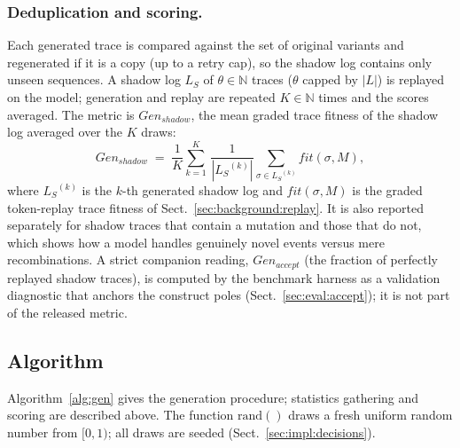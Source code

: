 \documentclass[runningheads]{llncs}
\newcommand{\genshadow}{\ensuremath{\mathit{Gen}_{\mathit{shadow}}}}
\newcommand{\genaccept}{\ensuremath{\mathit{Gen}_{\mathit{accept}}}}
\newcommand{\shlog}{\ensuremath{L_S}}
\begin{document}
\subsubsection{Deduplication and scoring.}
Each generated trace is compared against the set of original variants and regenerated if it is a copy (up to a retry cap), so the shadow log contains only unseen sequences. A shadow log $\shlog$ of $\theta\in\mathbb{N}$ traces ($\theta$ capped by $|L|$) is replayed on the model; generation and replay are repeated $K\in\mathbb{N}$ times and the scores averaged. The metric is \genshadow{}, the mean graded trace fitness of the shadow log averaged over the $K$ draws:
\begin{equation}
\genshadow \;=\; \frac{1}{K}\sum_{k=1}^{K}\,\frac{1}{|\shlog^{(k)}|}\sum_{\sigma\in\shlog^{(k)}}\mathit{fit}(\sigma,M),
\end{equation}
where $\shlog^{(k)}$ is the $k$-th generated shadow log and $\mathit{fit}(\sigma,M)$ is the graded token-replay trace fitness of Sect.~\ref{sec:background:replay}. It is also reported separately for shadow traces that contain a mutation and those that do not, which shows how a model handles genuinely novel events versus mere recombinations. A strict companion reading, \genaccept{} (the fraction of perfectly replayed shadow traces), is computed by the benchmark harness as a validation diagnostic that anchors the construct poles (Sect.~\ref{sec:eval:accept}); it is not part of the released metric.

\subsection{Algorithm}
\label{sec:method:algo}
Algorithm~\ref{alg:gen} gives the generation procedure; statistics gathering and scoring are described above. The function $\mathrm{rand}()$ draws a fresh uniform random number from $[0,1)$; all draws are seeded (Sect.~\ref{sec:impl:decisions}).
\end{document}
